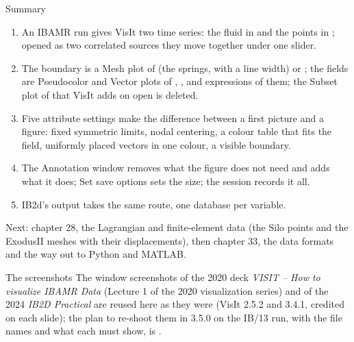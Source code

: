 \documentclass[aspectratio=169,11pt]{beamer}
\begin{document}
\begin{frame}{Summary}
\label{fr:summary}
\footnotesize
\begin{enumerate}
  \item An IBAMR run gives VisIt two time series: the fluid in  and the points in ; opened as two correlated sources they move together under one slider.
  \item The boundary is a Mesh plot of  (the springs, with a line width) or ; the fields are Pseudocolor and Vector plots of , ,  and expressions of them; the Subset plot of  that VisIt adds on open is deleted.
  \item Five attribute settings make the difference between a first picture and a figure: fixed symmetric limits, nodal centering, a colour table that fits the field, uniformly placed vectors in one colour, a visible boundary.
  \item The Annotation window removes what the figure does not need and adds what it does; Set save options sets the size; the session records it all.
  \item IB2d's  output takes the same route, one database per variable.
\end{enumerate}
\begin{homebox}
\footnotesize Next: chapter 28, the Lagrangian and finite-element data (the Silo points and the ExodusII meshes with their displacements), then chapter 33, the data formats and the way out to Python and MATLAB.
\end{homebox}
\end{frame}

\begin{frame}{The screenshots}
\label{fr:screenshots}
\small The window screenshots of the 2020 deck \emph{VISIT -- How to visualize IBAMR Data} (Lecture 1 of the 2020 visualization series) and of the 2024 \emph{IB2D Practical} are reused here as they were (VisIt 2.5.2 and 3.4.1, credited on each slide); the plan to re-shoot them in 3.5.0 on the IB/13 run, with the file names and what each must show, is .
\end{frame}
\end{document}
